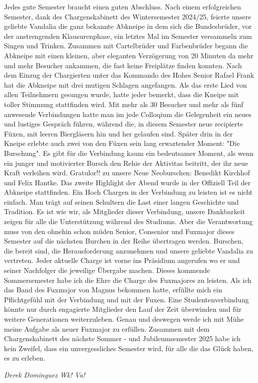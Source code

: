 \begin{multicols}{2}
Jedes gute Semester braucht einen guten Abschluss. Nach einem erfolgreichen
Semester, dank des Chargenskabinett des Wintersemester 2024/25, feierte unsere
geliebte Vandalia die ganz bekannte Abkneipe in dem sich die Bundesbrüder, vor
der anstrengenden Klausurenphase, ein letztes Mal im Semester versammeln zum
Singen und Trinken. Zusammen mit Cartelbrüder und Farbenbrüder begann die
Abkneipe mit einen kleinen, aber eleganten Verzögerung von 20 Minuten da mehr
und mehr Besucher ankammen, die fast keine Freiplätze finden konnten. Nach dem
Einzug der Chargierten unter das Kommando des Hohes Senior Rafael Frank hat die
Abkneipe mit drei mutigen Schlagen angefangen. Als das erste Lied von allen
Teilnehmern gesungen wurde, hatte jeder bemerkt, dass die Kneipe mit toller Stimmung
stattfinden wird. Mit mehr als 30 Besucher und mehr als fünf anwesende
Verbindungen hatte man im jede Colloqium die Gelegenheit ein neues und lustiges
Gespräch führen, während die, in diesem Semester neue recipierte Füxen, mit
leeren Biergläsern hin und her gelaufen sind. Später drin in der Kneipe erlebte
auch zwei von den Füxen sein lang erwartender Moment: "Die
Burschung". Es gibt für die Verbindung kaum ein bedeutsamer Moment, als
wenn ein junger und motivierter Bursch den Rehie der Aktivitas beitritt, der
ihr neue Kraft verleihen wird. Gratulor!! zu unsere Neue Neoburschen: Benedikt
Kirchhof und Felix Hantke. Das zweite Highlight der Abend wurde in der
Offiziell Teil der Abkneipe stattfinden. Ein Hoch Chargen in der Verbindung zu
leisten ist es nicht einfach. Man trägt auf seinen Schultern die Last einer
langen Geschichte und Tradition. Es ist wie wir, als Mitglieder dieser
Verbindung, unsere Dankbarkeit zeigen für alle die Unterstützung während des
Studiums. Aber die Verantwortung muss von den ohnehin schon müden Senior,
Consenior und Fuxmajor dieses Semester auf die nächsten Burchen in der Reihe
übertragen werden. Burschen, die bereit sind, die Herausforderung anzunehmen
und unsere geliebte Vandalia zu vertreten. Jeder aktuelle Charge ist vorne ins
Präsidium angerufen wo er und seiner Nachfolger die jeweilige Übergabe machen.
Dieses kommende Sommersemester habe ich die Ehre die Charge des Fuxmajores zu
leisten. Als ich das Band des Fuxmajor von Magnus bekommen hatte, erfüllte mich
ein Pflichtgefühl mit der Verbindung und mit der Fuxen. Eine Studentenverbindung
könnte nur durch engagierte Mitglieder den Lauf der Zeit überwinden und für
weitere Generationen weiterzuleben. Genau und deswegen werde ich mit Mühe meine
Aufgabe als neuer Fuxmajor zu erfüllen. Zusammen mit dem Chargenskabinett des
nächste Sommer - und Jubileumsemester 2025 habe ich kein Zweifel, dass ein
unvergessliches Semester wird, für alle die das Glück haben, es zu erleben.





	\begin{flushright}
		\hfill\emph{Derek Dominguez Wk! Va!}
	\end{flushright}
\end{multicols}
